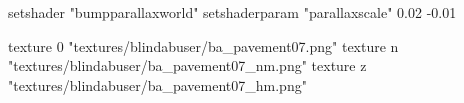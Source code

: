	setshader "bumpparallaxworld"
	setshaderparam "parallaxscale" 0.02 -0.01

		texture 0 "textures/blindabuser/ba_pavement07.png"
		texture n "textures/blindabuser/ba_pavement07_nm.png"
		texture z "textures/blindabuser/ba_pavement07_hm.png"

